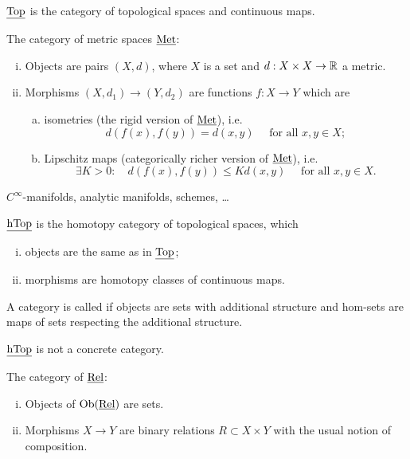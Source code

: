 \begin{examples*}
	\item \( \underline{\mathrm{Top}} \) is the category of topological spaces and continuous maps.
	\item The category of metric spaces \( \underline{\mathrm{Met}} \):
		\begin{enumerate}[(i)]
			\item Objects are pairs \( (X, d) \), where \( X \) is a set and \( d: X \times X \to \mathbb{R} \) a metric.
			\item Morphisms \( (X, d_1) \to (Y, d_2) \) are functions \( f: X \to Y \) which are
				\begin{enumerate}[a)]
					\item isometries (the rigid version of \( \underline{\mathrm{Met}} \)), i.e.
						\[
							d(f(x), f(y)) = d(x, y) \quad \text{ for all } x, y \in X;
						\]
					\item Lipschitz maps (categorically richer version of \( \underline{\mathrm{Met}} \)), i.e.
						\[
							\exists K > 0: \quad d(f(x), f(y)) \le K d(x, y) \quad \text{ for all } x, y \in X.
						\]
				\end{enumerate}
		\end{enumerate}

	\item \( C^{\infty} \)-manifolds, analytic manifolds, schemes, \dots
	\item \( \underline{\mathrm{hTop}} \) is the homotopy category of topological spaces, which
		\begin{enumerate}[(i)]
			\item objects are the same as in \( \underline{\mathrm{Top}} \);
			\item morphisms are homotopy classes of continuous maps.
		\end{enumerate}

		\begin{definition*}[intuitive]
			A category is called  if objects are sets with additional structure and hom-sets are maps of sets respecting the additional structure.
		\end{definition*}

		\begin{theorem*}[w/o proof]
			\( \underline{\mathrm{hTop}} \) is not a concrete category.
		\end{theorem*}

	\item The category of  \( \underline{\mathrm{Rel}} \):
		\begin{enumerate}[(i)]
			\item Objects of \( \operatorname{Ob}(\underline{\mathrm{Rel}}) \) are sets.
			\item Morphisms \( X \to Y \) are binary relations \( R \subset X \times Y \) with the usual notion of composition.
		\end{enumerate}


\end{examples*}
